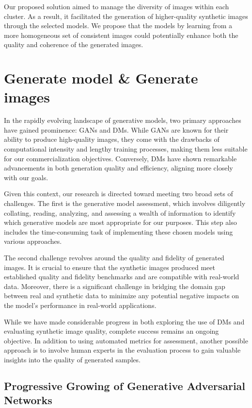 Our proposed solution aimed to manage the diversity of images within each cluster. As a result, it facilitated the generation of higher-quality synthetic images through the selected models. We propose that the models by learning from a more homogeneous set of consistent images could potentially enhance both the quality and coherence of the generated images.


\section{Generate model \& Generate images}

In the rapidly evolving landscape of generative models, two primary approaches have gained prominence: GANs and DMs. While GANs are known for their ability to produce high-quality images, they come with the drawbacks of computational intensity and lengthy training processes, making them less suitable for our commercialization objectives. Conversely, DMs have shown remarkable advancements in both generation quality and efficiency, aligning more closely with our goals.

Given this context, our research is directed toward meeting two broad sets of challenges. The first is the generative model assessment, which involves diligently collating, reading, analyzing, and assessing a wealth of information to identify which generative models are most appropriate for our purposes. This step also includes the time-consuming task of implementing these chosen models using various approaches.

The second challenge revolves around the quality and fidelity of generated images. It is crucial to ensure that the synthetic images produced meet established quality and fidelity benchmarks and are compatible with real-world data. Moreover, there is a significant challenge in bridging the domain gap between real and synthetic data to minimize any potential negative impacts on the model's performance in real-world applications.

While we have made considerable progress in both exploring the use of DMs and evaluating synthetic image quality, complete success remains an ongoing objective. In addition to using automated metrics for assessment, another possible approach is to involve human experts in the evaluation process to gain valuable insights into the quality of generated samples.

\subsection{Progressive Growing of Generative Adversarial Networks}

